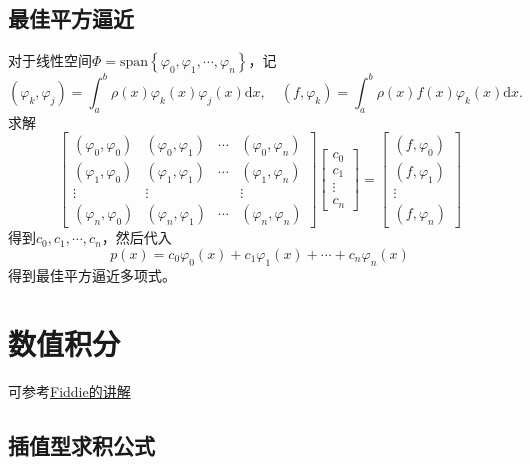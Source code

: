 \subsection{最佳平方逼近}
对于线性空间$\Phi=\mathrm{span} \left\{\varphi_0, \varphi_1, \cdots, \varphi_n\right\}$，记
\[
    \left(\varphi_k, \varphi_j\right)=\int_a^b \rho(x) \varphi_k(x) \varphi_j(x) \mathrm{d} x, \quad\left(f, \varphi_k\right)=\int_a^b \rho(x) f(x) \varphi_k(x) \mathrm{d} x .
\]
求解
\[
    \left[\begin{array}{cccc}
            \left(\varphi_0, \varphi_0\right) & \left(\varphi_0, \varphi_1\right) & \cdots & \left(\varphi_0, \varphi_n\right) \\
            \left(\varphi_1, \varphi_0\right) & \left(\varphi_1, \varphi_1\right) & \cdots & \left(\varphi_1, \varphi_n\right) \\
            \vdots                            & \vdots                            &        & \vdots                            \\
            \left(\varphi_n, \varphi_0\right) & \left(\varphi_n, \varphi_1\right) & \cdots & \left(\varphi_n, \varphi_n\right)
        \end{array}\right]\begin{bmatrix}
        c_0    \\
        c_1    \\
        \vdots \\
        c_n
    \end{bmatrix}=\begin{bmatrix}
        (f, \varphi_0) \\
        (f, \varphi_1) \\
        \vdots         \\
        (f, \varphi_n)
    \end{bmatrix}
\]
得到$c_0,c_1,\cdots,c_n$，然后代入
\[
    p(x)=c_0\varphi_0(x)+c_1\varphi_1(x)+\cdots+c_n\varphi_n(x)
\]
得到最佳平方逼近多项式。

\section{数值积分}

可参考\href{https://www.bilibili.com/video/BV1jZ4y1B7w2?spm_id_from=333.788.videopod.sections&vd_source=b55594d2ba73cdd7666e94ca2cf2fe93}{Fiddie的讲解}

\subsection{插值型求积公式}


